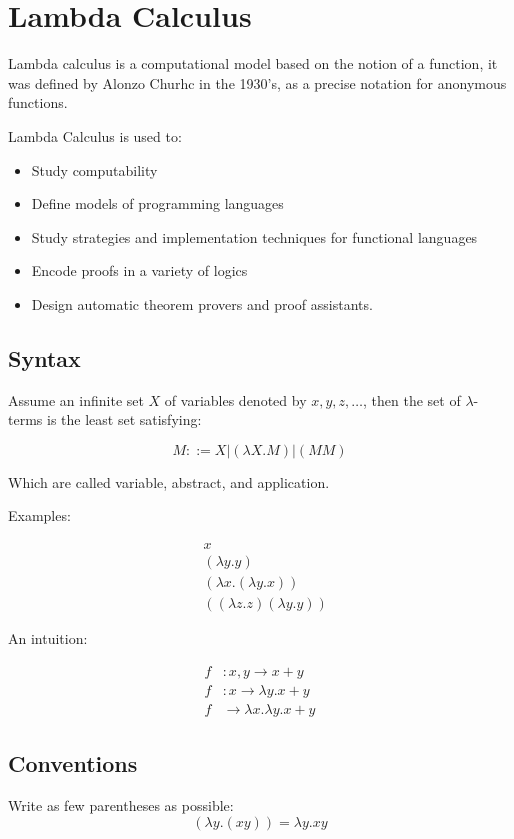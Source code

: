 \section{Lambda Calculus}
Lambda calculus is a computational model based on the notion of a function,
it was defined by Alonzo Churhc in the 1930's, as a precise notation
for anonymous functions.

Lambda Calculus is used to:
\begin{itemize}
    \item Study computability
    \item Define models of programming languages
    \item Study strategies and implementation techniques for functional languages
    \item Encode proofs in a variety of logics
    \item Design automatic theorem provers and proof assistants.
\end{itemize} 

\subsection{Syntax}
Assume an infinite set $X$ of variables denoted by $x,y,z,\ldots$, then the set
of $\lambda$-terms is the least set satisfying:

$$
M::=X|(\lambda X.M) | (MM)
$$

Which are called variable, abstract, and application.

Examples:

\begin{align}
&x \\
&(\lambda y.y) \\
&(\lambda x.(\lambda y.x)) \\
&((\lambda z.z)(\lambda y.y))
\end{align}

An intuition:

\begin{align}
f & : x,y \to x + y \\
f & : x \to \lambda y.x + y \\
f & \to \lambda x.\lambda y.x + y
\end{align}

\subsection{Conventions}
Write as few parentheses as possible:
$$
(\lambda y.(xy)) = \lambda y.xy
$$


